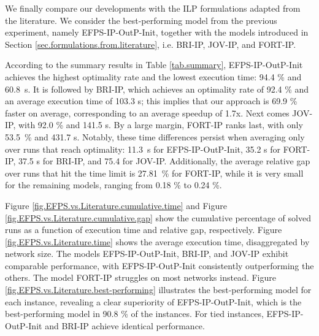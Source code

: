 \documentclass{article}
\newcommand{\EFPSIP}{EFPS-IP\xspace}
\newcommand{\BRIIP}{BRI-IP\xspace}
\newcommand{\JOVIP}{JOV-IP\xspace}
\newcommand{\FORTIP}{FORT-IP\xspace}
\begin{document}
We finally compare our developments with the ILP formulations adapted from the literature.
We consider the best-performing model from the previous experiment, namely \EFPSIP-OutP-Init, together with the models introduced in Section \ref{sec.formulations.from.literature}, i.e. \BRIIP, \JOVIP, and \FORTIP.

According to the summary results in Table \ref{tab.summary}, \EFPSIP-OutP-Init achieves the highest optimality rate and the lowest execution time: 94.4 \% and \mbox{60.8 s}.
It is followed by \BRIIP, which achieves an optimality rate of 92.4 \% and an average execution time of 103.3 s; this implies that our approach is 69.9 \% faster on average, corresponding to an average speedup of 1.7x.
Next comes \JOVIP, with 92.0 \% and 141.5 s.
By a large margin, \FORTIP ranks last, with only \mbox{53.5 \%} and 431.7 s.
Notably, these time differences persist when averaging only over runs that reach optimality: \mbox{11.3 s} for \EFPSIP-OutP-Init, 35.2 s for \FORTIP, 37.5 s for \BRIIP, and 75.4 for \JOVIP.
Additionally, the average relative gap over runs that hit the time limit is \mbox{27.81 \%} for \FORTIP, while it is very small for the remaining models, ranging from 0.18 \% to 0.24 \%.

Figure \ref{fig.EFPS.vs.Literature.cumulative.time} and Figure \ref{fig.EFPS.vs.Literature.cumulative.gap} show the cumulative percentage of solved runs as a function of execution time and relative gap, respectively.
Figure \ref{fig.EFPS.vs.Literature.time} shows the average execution time, disaggregated by network size.
The models \EFPSIP-OutP-Init, \BRIIP, and \JOVIP exhibit comparable performance, with \EFPSIP-OutP-Init consistently outperforming the others.
The model \FORTIP struggles on most networks instead.
Figure \ref{fig.EFPS.vs.Literature.best-performing} illustrates the best-performing model for each instance, revealing a clear superiority of \EFPSIP-OutP-Init, which is the best-performing model in 90.8 \% of the instances.
For tied instances, \EFPSIP-OutP-Init and \BRIIP achieve identical performance.
\end{document}

